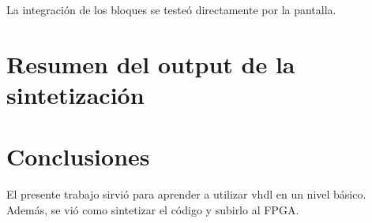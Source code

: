 \documentclass[a4paper,10pt]{article}
\begin{document}
La integración de los bloques se testeó directamente por la pantalla.
\section{Resumen del output de la sintetización}


\section{Conclusiones}
El presente trabajo sirvió para aprender a utilizar vhdl en un nivel básico. Además, se vió como sintetizar el código y subirlo al FPGA.

\end{document}
